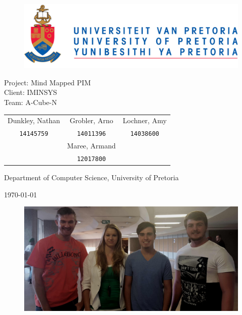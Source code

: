 \documentclass[english]{article}
\date{\today}
\begin{document}
	
	\begin{titlepage}
		\begin{figure}[!t]
			\includegraphics[width=\linewidth]{up_logo.png}
		\end{figure}
		\begin{center}
			\huge{Project: Mind Mapped PIM}\\
			\large{Client: IMINSYS}\\
			\vspace{10mm}
			\huge{Team: A-Cube-N}\\
		\end{center}
		\begin{center}
			\begin{tabular}{ c c c }
				Dunkley, Nathan & Grobler, Arno & Lochner, Amy \\
				\texttt{14145759} & \texttt{14011396} & \texttt{14038600}\\
				& Maree, Armand &\\
				& \texttt{12017800} &
			\end{tabular}
		\end{center}
		\begin{center}
			Department of Computer Science, University of Pretoria
		\end{center}
		\begin{center}
			\today
			\begin{figure}[!h]
				\includegraphics[width=\linewidth]{team.jpg}
			\end{figure}
		\end{center}
	\end{titlepage}
	\newpage
	\tableofcontents
	\newpage
\end{document}
